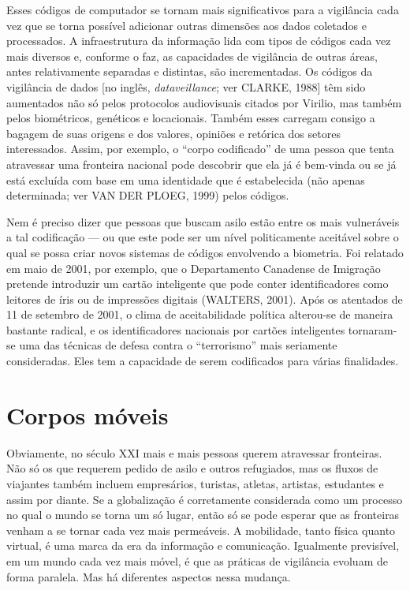 Esses códigos de computador se tornam mais significativos para a
vigilância cada vez que se torna possível adicionar outras dimensões aos
dados coletados e processados. A infraestrutura da informação lida com
tipos de códigos cada vez mais diversos e, conforme o faz, as
capacidades de vigilância de outras áreas, antes relativamente separadas
e distintas, são incrementadas. Os códigos da vigilância de dados {[}no
inglês, \emph{dataveillance}; ver CLARKE, 1988{]} têm sido aumentados
não só pelos protocolos audiovisuais citados por Virilio, mas também
pelos biométricos, genéticos e locacionais. Também esses carregam
consigo a bagagem de suas origens e dos valores, opiniões e retórica dos
setores interessados. Assim, por exemplo, o ``corpo codificado'' de uma
pessoa que tenta atravessar uma fronteira nacional pode descobrir que
ela já é bem-vinda ou se já está excluída com base em uma identidade que
é estabelecida (não apenas determinada; ver VAN DER PLOEG, 1999) pelos
códigos.

Nem é preciso dizer que pessoas que buscam asilo estão entre os mais
vulneráveis a tal codificação --- ou que este pode ser um nível
politicamente aceitável sobre o qual se possa criar novos sistemas de
códigos envolvendo a biometria. Foi relatado em maio de 2001, por
exemplo, que o Departamento Canadense de Imigração pretende introduzir
um cartão inteligente que pode conter identificadores como leitores de
íris ou de impressões digitais (WALTERS, 2001). Após os atentados de 11
de setembro de 2001, o clima de aceitabilidade política alterou-se de
maneira bastante radical, e os identificadores nacionais por cartões
inteligentes tornaram-se uma das técnicas de defesa contra o
``terrorismo'' mais seriamente consideradas. Eles tem a capacidade de
serem codificados para várias finalidades.

\section{Corpos móveis}

Obviamente, no século XXI mais e mais pessoas querem atravessar
fronteiras. Não só os que requerem pedido de asilo e outros refugiados,
mas os fluxos de viajantes também incluem empresários, turistas,
atletas, artistas, estudantes e assim por diante. Se a globalização é
corretamente considerada como um processo no qual o mundo se torna um só
lugar, então só se pode esperar que as fronteiras venham a se tornar
cada vez mais permeáveis. A mobilidade, tanto física quanto virtual, é
uma marca da era da informação e comunicação. Igualmente previsível, em
um mundo cada vez mais móvel, é que as práticas de vigilância evoluam de
forma paralela. Mas há diferentes aspectos nessa mudança.

